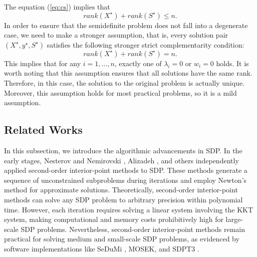 \documentclass{jcmlatex}
\begin{document}
The equation (\ref{eq:cs}) implies that
\begin{equation*}
rank(X^{\star}) + rank(S^{\star}) \leq n.
\end{equation*}
In order to ensure that the semidefinite problem does not fall into a degenerate case, we need to make a stronger assumption, that is, every solution pair \((X^{\star},y^{\star},S^{\star})\) satisfies the following stronger strict complementarity condition:
\begin{equation*}
rank(X^{\star}) + rank(S^{\star}) = n.
\end{equation*}
This implies that for any \(i = 1, \dots, n\), exactly one of \(\lambda_i = 0\) or \(w_i = 0\) holds. It is worth noting that this assumption ensures that all solutions have the same rank. Therefore, in this case, the solution to the original problem is actually unique\cite{lemon2016low}. Moreover, this assumption holds for most practical problems, so it is a mild assumption.

\subsection{Related Works}
In this subsection, we introduce the algorithmic advancements in SDP. In the early stages, Nesterov and Nemirovski \cite{nesterov1989self,nesterov1994interior}, Alizadeh \cite{alizadeh1995interior,alizadeh1991combinatorial}, and others independently applied second-order interior-point methods to SDP. These methods generate a sequence of unconstrained subproblems during iterations and employ Newton's method for approximate solutions. Theoretically, second-order interior-point methods can solve any SDP problem to arbitrary precision within polynomial time. However, each iteration requires solving a linear system involving the KKT system, making computational and memory costs prohibitively high for large-scale SDP problems. Nevertheless, second-order interior-point methods remain practical for solving medium and small-scale SDP problems, as evidenced by software implementations like SeDuMi \cite{sturm1999using}, MOSEK\cite{aps2019mosek}, and SDPT3 \cite{toh1999sdpt3}.
\end{document}
